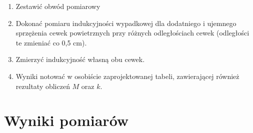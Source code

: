 \documentclass[a4paper,10pt,twoside]{article}
\begin{document}
	\begin{enumerate}
		\item Zestawić obwód pomiarowy
		\item Dokonać pomiaru indukcyjności wypadkowej dla dodatniego i ujemnego sprzężenia cewek powietrznych przy różnych odległościach cewek (odległości te zmieniać co 0,5 cm).
		\item Zmierzyć indukcyjność własną obu cewek.
		\item Wyniki notować w osobiście zaprojektowanej tabeli, zawierającej również rezultaty obliczeń $M$ oraz $k$.
	\end{enumerate}
\newpage
	
	\section{Wyniki pomiarów}
	
\end{document}
